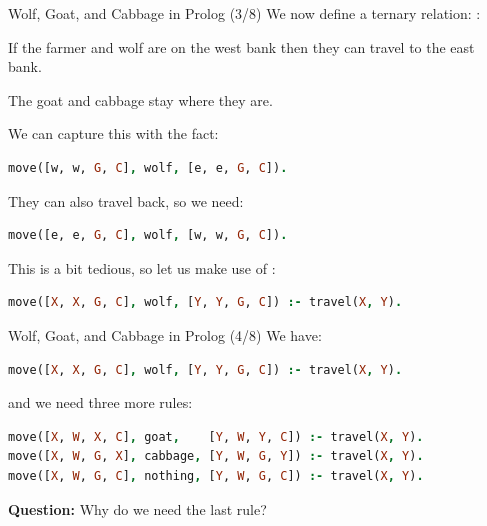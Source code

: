 \begin{frame}[fragile]{Wolf, Goat, and Cabbage in Prolog (3/8)}
We now define a ternary relation: :

If the farmer and wolf are on the west bank then they can travel to the east bank. 

The goat and cabbage stay where they are. 

We can capture this with the fact:

\begin{lstlisting}[language=prolog, xleftmargin=0.5cm]
move([w, w, G, C], wolf, [e, e, G, C]).
\end{lstlisting}

\pause

They can also travel back, so we need:

\begin{lstlisting}[language=prolog, xleftmargin=0.5cm]
move([e, e, G, C], wolf, [w, w, G, C]).
\end{lstlisting}

\pause

This is a bit tedious, so let us make use of :

\begin{lstlisting}[language=prolog, xleftmargin=0.5cm]
move([X, X, G, C], wolf, [Y, Y, G, C]) :- travel(X, Y).
\end{lstlisting}
\end{frame}

\begin{frame}[fragile]{Wolf, Goat, and Cabbage in Prolog (4/8)}
We have:

\begin{lstlisting}[language=prolog, xleftmargin=0.5cm]
move([X, X, G, C], wolf, [Y, Y, G, C]) :- travel(X, Y).
\end{lstlisting}

\pause

and we need three more rules:

\begin{lstlisting}[language=prolog, xleftmargin=0.5cm]
move([X, W, X, C], goat,    [Y, W, Y, C]) :- travel(X, Y).
move([X, W, G, X], cabbage, [Y, W, G, Y]) :- travel(X, Y).
move([X, W, G, C], nothing, [Y, W, G, C]) :- travel(X, Y).
\end{lstlisting}

\pause

\textbf{Question:} Why do we need the last rule?
\end{frame}

